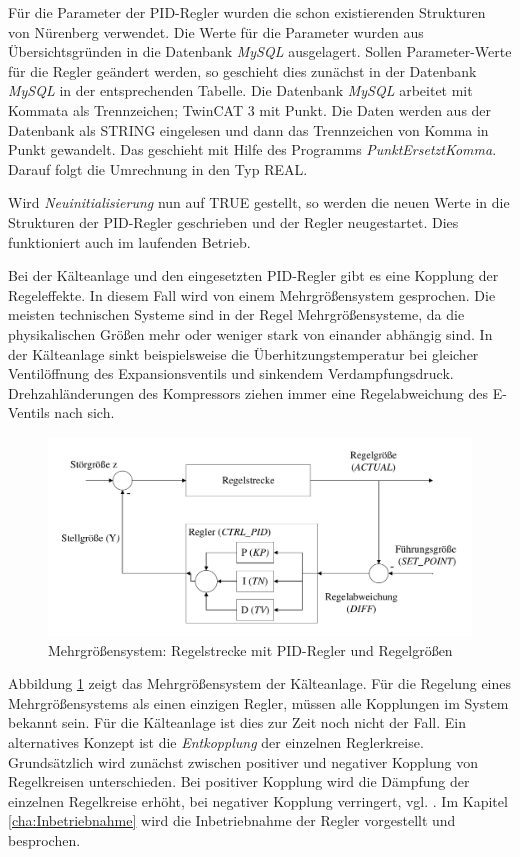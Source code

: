 Für die Parameter der PID-Regler wurden die schon existierenden Strukturen von Nürenberg \citep{Nuerenberg2015} verwendet. Die Werte für die Parameter wurden aus Übersichtsgründen in die Datenbank \textit{MySQL} ausgelagert. Sollen Parameter-Werte für die Regler geändert werden, so geschieht dies zunächst in der Datenbank  \textit{MySQL} in der entsprechenden Tabelle. Die Datenbank \textit{MySQL} arbeitet mit Kommata als Trennzeichen; TwinCAT 3 mit Punkt. Die Daten werden aus der Datenbank als STRING eingelesen und dann das Trennzeichen von Komma in Punkt gewandelt. Das geschieht mit Hilfe des Programms \textit{PunktErsetztKomma}. Darauf folgt die Umrechnung in den Typ REAL. 

Wird \textit{Neuinitialisierung} nun auf TRUE gestellt, so werden die neuen Werte in die Strukturen der PID-Regler geschrieben und der Regler neugestartet. Dies funktioniert auch im laufenden Betrieb. 

Bei der Kälteanlage und den eingesetzten PID-Regler gibt es eine Kopplung der Regeleffekte. In diesem Fall wird von einem Mehrgrößensystem gesprochen. Die meisten technischen Systeme sind in der Regel Mehrgrößensysteme, da die physikalischen Größen mehr oder weniger stark von einander abhängig sind. In der Kälteanlage  sinkt beispielsweise die Überhitzungstemperatur bei gleicher Ventilöffnung des Expansionsventils und sinkendem Verdampfungsdruck. Drehzahländerungen des Kompressors ziehen immer eine Regelabweichung des E-Ventils nach sich.

\begin{figure}[htb]
\centering		\includegraphics[page=2, width=1.0\textwidth]{Pictures/Versuchsaufbau/PID-Regler.pdf}
\caption{Mehrgrößensystem: Regelstrecke mit PID-Regler und Regelgrößen}
\label{fig:AllePIDs}
\end{figure}


Abbildung \ref{fig:AllePIDs} zeigt das Mehrgrößensystem der Kälteanlage. Für die Regelung eines Mehrgrößensystems als einen einzigen Regler, müssen alle Kopplungen im System bekannt sein. Für die Kälteanlage ist dies zur Zeit noch nicht der Fall. 
Ein alternatives Konzept ist die \textit{Entkopplung} der einzelnen Reglerkreise. Grundsätzlich wird zunächst zwischen positiver und negativer Kopplung von Regelkreisen unterschieden. Bei positiver Kopplung wird die Dämpfung der einzelnen Regelkreise erhöht, bei negativer Kopplung verringert, vgl. \citep{Schwarz2013}. Im Kapitel \ref{cha:Inbetriebnahme} wird die  Inbetriebnahme der Regler vorgestellt und besprochen.   



